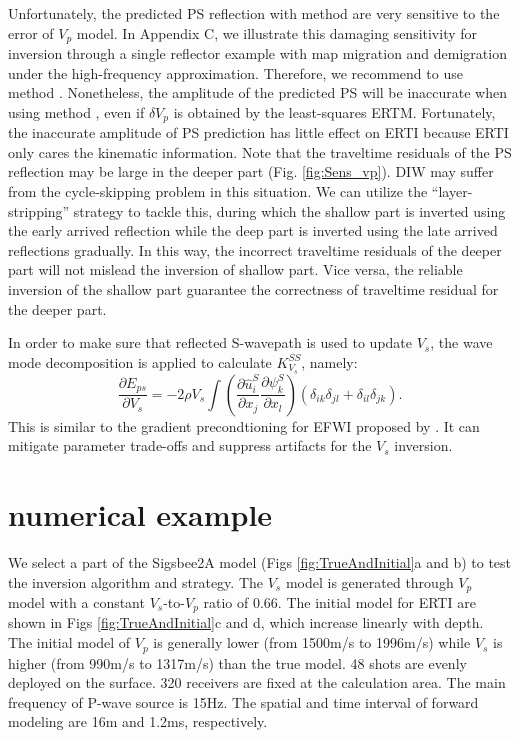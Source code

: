 \documentclass[extra,mreferee]{gji}
\newcommand{\Rome}[1]{{\bf\uppercase\expandafter{\romannumeral #1\relax}}}
\begin{document}
Unfortunately, the predicted PS reflection with method \Rome{1} are
very sensitive to the error of $V_p$ model. 
In Appendix C, we illustrate this damaging sensitivity for inversion through a single reflector
example with
map migration and demigration under the high-frequency approximation.
Therefore, we recommend to use method \Rome{2}.
Nonetheless, the amplitude of the predicted PS will be inaccurate when using 
method \Rome{2}, even if $\delta V_p$ is obtained by the
least-squares ERTM. 
Fortunately, the inaccurate amplitude of PS prediction has little effect on ERTI because ERTI only
cares the kinematic information.
Note that 
the traveltime residuals of the PS reflection may be 
large in the deeper part (Fig. \ref{fig:Sens_vp}). DIW may suffer from the cycle-skipping problem in this
situation. We can utilize the ``layer-stripping'' strategy to tackle this, during which the shallow part is
inverted using the early arrived reflection while the deep part is inverted using the late
arrived reflections gradually. In this way, the incorrect traveltime residuals of the deeper part will not
mislead the inversion of shallow part. Vice versa, the reliable inversion of the shallow part
guarantee
the correctness of traveltime residual for the deeper part.

In order to make sure that reflected S-wavepath is used to update $V_s$, the wave mode decomposition 
is applied to calculate $K^{SS}_{V_s}$, namely:
\begin{equation}
	\frac{\partial E_{ps}}{\partial V_s}=-2\rho V_s
	\int (\frac{\partial \hat{u}^S_{i}}{\partial
    x_j}\frac{\partial \psi^S_{k}}{\partial x_l})
	(\delta_{ik}\delta_{jl}+
	\delta_{il}\delta_{jk}).
    \label{eq:GradientVel_MD}
\end{equation}
This is similar to the gradient precondtioning for EFWI proposed by \cite{WangEtAl2017}. 
It can mitigate parameter trade-offs and suppress artifacts for the
$V_s$ inversion.
\section{numerical example}
We select a part of the Sigsbee2A model (Figs
\ref{fig:TrueAndInitial}a and b) to test the inversion algorithm and strategy.
The $V_s$ model is generated through $V_p$ model with a constant $V_s$-to-$V_p$ ratio of 0.66. 
The initial model for ERTI are shown in 
Figs \ref{fig:TrueAndInitial}c and d, which increase linearly with depth.
The initial model of $V_p$ is generally lower (from 1500m/s to 1996m/s) while 
$V_s$ is higher  (from 990m/s to 1317m/s) than the true model. 
48 shots are evenly deployed on the surface.
320 receivers are fixed at the calculation area.
The main frequency of P-wave source is 15Hz.
The spatial and time interval of forward modeling are 16m and 1.2ms, respectively.
\end{document}
